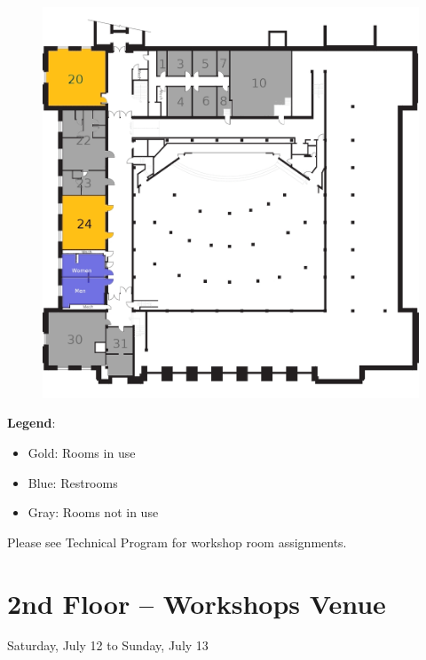 \begin{figure}[h!]
\center
\includegraphics[height=0.6\textheight]{local_img/maps/basement_edited}
\end{figure}

\vspace{0.3cm}

{\Large \textbf{Legend}: 
\begin{itemize}
\itemsep0em 
\item Gold: Rooms in use 
\item Blue: Restrooms
\item Gray: Rooms not in use
\end{itemize}
}

\vspace{0.3cm}
{\Large Please see Technical Program for workshop room assignments.}

\newpage
{} \section{2nd Floor -- Workshops Venue}
{\large Saturday, July 12 to Sunday, July 13}


